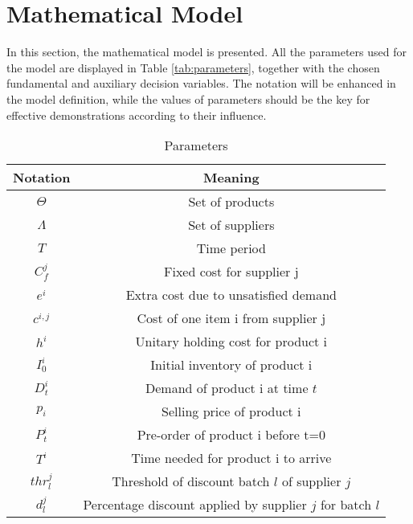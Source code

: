 \documentclass{article}
\begin{document}
\section{Mathematical Model}\label{sec:mathModel}
In this section, the mathematical model is presented. All the parameters used for the model are displayed in Table \ref{tab:parameters}, together with the chosen fundamental and auxiliary decision variables. The notation will be enhanced in the model definition, while the values of parameters should be the key for effective demonstrations according to their influence. \begin{table} [H]
    \centering
    \begin{subtable}[c]{\textwidth}
        \centering
	    \begin{tabular}{|c|c|} 
		\hline
		\textbf{Notation} & \textbf{Meaning}  \\
		\hline
		$\Theta$ & Set of products\\
		$\Lambda$ & Set of suppliers\\
		$T$ & Time period \\
		$C_f^j$ & Fixed cost for supplier j \\
		$e^i$ & Extra cost due to unsatisfied demand\\
		$c^{i,j}$ & Cost of one item i from supplier j\\
		$h^i$ & Unitary holding cost for product i\\
		$I^i_0$ & Initial inventory of product i\\
		$D^i_t$ & Demand of product i at time $t$ \\
		$p_i$ & Selling price of product i\\
		$P_t^i$ & Pre-order of product i before t=0\\
		$T^i$ & Time needed for product i to arrive \\ 
		$thr^j_{l}$ & Threshold of discount batch $l$ of supplier $j$\\ 
		$d^j_l$ & Percentage discount applied by supplier $j$ for batch $l$\\
		\hline
		\end{tabular}
        \caption{Parameters}
        \vspace{5mm}
    \end{subtable}
	

\end{table}
\end{document}
